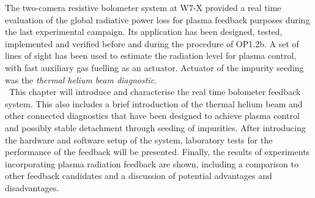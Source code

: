     The two-camera resistive bolometer system at W7-X provided a real time evaluation of the global radiative power loss for plasma feedback purposes during the last experimental campaign. Its application has been designed, tested, implemented and verified before and during the procedure of OP1.2b. A set of lines of sight has been used to estimate the radiation level for plasma control, with fast auxiliary gas fuelling as an actuator. Actuator of the impurity seeding was the \textit{thermal helium beam diagnostic}\cite{Krychowiak2011}.\\%
    \,\newline%
    This chapter will introduce and characterise the real time bolometer feedback system. This also includes a brief introduction of the thermal helium beam and other connected diagnostics that have been designed to achieve plasma control and possibly stable detachment through seeding of impurities. After introducing the hardware and software setup of the system, laboratory tests for the performance of the feedback will be presented. Finally, the results of experiments incorporating plasma radiation feedback are shown, including a comparison to other feedback candidates and a discussion of potential advantages and disadvantages.%
%
